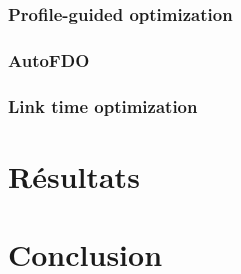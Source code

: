 \documentclass[a4paper,12pt]{report}
\begin{document}
        \subsection{Profile-guided optimization}

        \subsection{AutoFDO}

        \subsection{Link time optimization}

\chapter{Résultats}


\chapter*{Conclusion}


\printbibliography


\begin{appendices}


\end{appendices}
\end{document}
